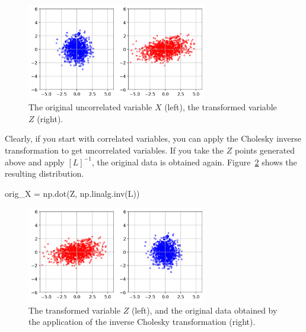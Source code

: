 \begin{figure}[htbp]
\centering
\includegraphics[width=0.7\textwidth]{figures/cholesky_norm}
\caption{The original uncorrelated variable $X$ (left), the transformed variable $Z$ (right).}
\label{fig:cholesky_norm}
\end{figure}

Clearly, if you start with correlated variables, you can apply the Cholesky inverse transformation to get uncorrelated variables.
If you take the $Z$ points generated above and apply $[L]^{-1}$, the original data is obtained again. Figure~\ref{fig:cholesky_inv} shows the resulting distribution.

\begin{ipython}
orig_X = np.dot(Z, np.linalg.inv(L))
\end{ipython}

\begin{figure}[htbp]
\centering
\includegraphics[width=0.7\textwidth]{figures/cholesky_inv}
\caption{The transformed variable $Z$ (left), and the original data obtained by the application of the inverse Cholesky transformation (right).}
\label{fig:cholesky_inv}
\end{figure}

